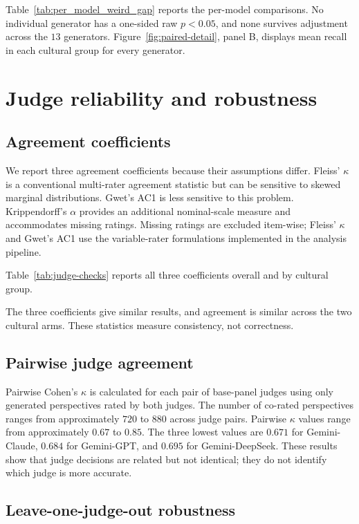 \documentclass[11pt,a4paper]{article}
\begin{document}
Table~\ref{tab:per_model_weird_gap} reports the per-model comparisons. No individual generator has a one-sided raw $p<0.05$, and none survives adjustment across the $13$ generators.
Figure~\ref{fig:paired-detail}, panel B, displays mean recall in each cultural group for every generator.

\section{Judge reliability and robustness}
\label{app:reliability}

\subsection{Agreement coefficients}
\label{app:agreement_coefficients}

We report three agreement coefficients because their assumptions differ. Fleiss' $\kappa$ is a conventional multi-rater agreement statistic but can be sensitive to skewed marginal distributions. Gwet's AC1 is less sensitive to this problem. Krippendorff's $\alpha$ provides an additional nominal-scale measure and accommodates missing ratings. Missing ratings are excluded item-wise; Fleiss' $\kappa$ and Gwet's AC1 use the variable-rater formulations implemented in the analysis pipeline.

Table~\ref{tab:judge-checks} reports all three coefficients overall and by cultural group.

The three coefficients give similar results, and agreement is similar across the two cultural arms. These statistics measure consistency, not correctness.

\subsection{Pairwise judge agreement}
\label{app:pairwise_judges}

Pairwise Cohen's $\kappa$ is calculated for each pair of base-panel judges using only generated perspectives rated by both judges. The number of co-rated perspectives ranges from approximately $720$ to $880$ across judge pairs. Pairwise $\kappa$ values range from approximately $0.67$ to $0.85$. The three lowest values are $0.671$ for Gemini-Claude, $0.684$ for Gemini-GPT, and $0.695$ for Gemini-DeepSeek. These results show that judge decisions are related but not identical; they do not identify which judge is more accurate.

\subsection{Leave-one-judge-out robustness}
\label{app:lojo}
\end{document}
